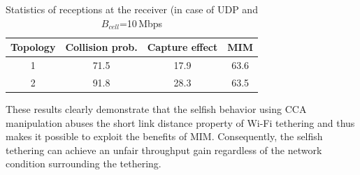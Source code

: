\begin{table}[ht]\label{table:ratio}
\renewcommand{\arraystretch}{1.2}
\caption{Statistics of receptions at the receiver (in case of UDP
and $B_{cell}$=10\,Mbps}
\vspace{-0.2cm}
\centering
\begin{tabular}{|c|c c c |}
\hline \bfseries Topology & Collision prob. & Capture effect & MIM\\
\hline\hline
1 & 71.5 & 17.9 & 63.6 \\
\hline
2 & 91.8 & 28.3 & 63.5 \\
\hline
\end{tabular}\label{tbl:txdist}
\end{table}

These results clearly demonstrate that the selfish behavior using CCA
manipulation abuses the short link distance property of Wi-Fi
tethering and thus makes it possible to exploit the benefits of MIM.
Consequently, the selfish tethering can achieve an unfair throughput
gain regardless of the network condition surrounding the tethering.

